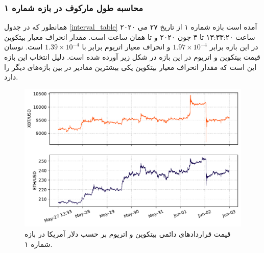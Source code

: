 \subsubsection{محاسبه طول مارکوف در بازه شماره ۱}
همانطور که در جدول \ref{interval_table} آمده است بازه شماره ۱ از تاریخ ۲۷ می ۲۰۲۰ ساعت ۱۳:۳۳:۲۰ تا ۳ جون ۲۰۲۰ و تا همان ساعت است. 
مقدار انحراف معیار بیتکوین در این بازه برابر $1.97 \times 10^{-4}$ و انحراف معیار اتریوم برابر با $1.39 \times 10^{-4}$ 
است. نوسان قیمت بیتکوین و اتریوم در این بازه در شکل زیر آورده شده است. دلیل انتخاب این بازه این است که مقدار انحراف معیار بیتکوین یکی بیشترین مقادیر 
در بین بازه‌های دیگر را دارد.
\begin{figure}[H]
  \centering
  \includegraphics[width=\textwidth]{images/xbteth1.pdf}
  \caption{قیمت قراردادهای دائمی بیتکوین و اتریوم بر حسب دلار آمریکا در بازه شماره ۱.}\label{fig:XBTETH1}
\end{figure}

